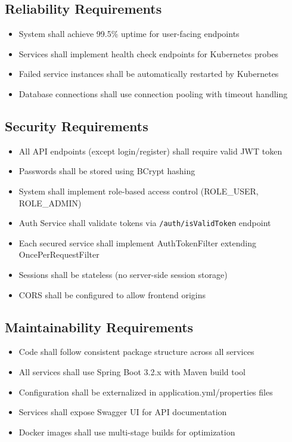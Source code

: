 \subsection{Reliability Requirements}

\begin{itemize}
    \item System shall achieve 99.5\% uptime for user-facing endpoints
    \item Services shall implement health check endpoints for Kubernetes probes
    \item Failed service instances shall be automatically restarted by Kubernetes
    \item Database connections shall use connection pooling with timeout handling
\end{itemize}

\subsection{Security Requirements}

\begin{itemize}
    \item All API endpoints (except login/register) shall require valid JWT token
    \item Passwords shall be stored using BCrypt hashing
    \item System shall implement role-based access control (ROLE\_USER, ROLE\_ADMIN)
    \item Auth Service shall validate tokens via \texttt{/auth/isValidToken} endpoint
    \item Each secured service shall implement AuthTokenFilter extending OncePerRequestFilter
    \item Sessions shall be stateless (no server-side session storage)
    \item CORS shall be configured to allow frontend origins
\end{itemize}

\subsection{Maintainability Requirements}

\begin{itemize}
    \item Code shall follow consistent package structure across all services
    \item All services shall use Spring Boot 3.2.x with Maven build tool
    \item Configuration shall be externalized in application.yml/properties files
    \item Services shall expose Swagger UI for API documentation
    \item Docker images shall use multi-stage builds for optimization
\end{itemize}

